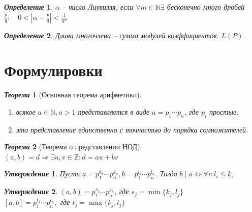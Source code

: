 \documentclass[a4paper,12pt]{article}
\newtheorem{deff2}{\textit{Определение}}
\newtheorem{teo2}{\textit{Теорема}}
\newtheorem{utv2}{\textit{Утверждение}}
\newcommand{\AL}{\alpha}
\newcommand{\q}{\quad}
\newcommand{\Ra}{\Rightarrow}
\newcommand{\bb}[1]{\mathbb{#1}}
\begin{document}
\begin{formbox}{}
\begin{deff2} $\AL$ -- число Лиувилля, если $\forall m\in\bb{N} \exists$ бесконечно много дробей $\frac{p}{q}: \q 0 < |\AL - \frac{p}{q}| < \frac{1}{q^m}$
\end{deff2}
\end{formbox}
\begin{formbox}{}
\begin{deff2} Длина многочлена -- сумма модулей коэффициентов. $L(P)$
\end{deff2}
\end{formbox}









\newpage
\section{Формулировки}
\begin{formbox}{}
\begin{teo2}[Основная теорема арифметики]\q\\
\begin{enumerate}
    \item всякое $a \in \bb{N}, a > 1$ представляется в виде $a = p_1\cdots p_n$, где $p_i$ простые.
    \item это представление единственно с точностью до порядка сомножителей.
\end{enumerate}
\end{teo2}
\end{formbox}
\begin{formbox}{}
\begin{teo2}[Теорема о представлении НОД]\q\\
$(a,b) = d \Ra \exists u,v\in\bb{Z}: d = au+bv$
\end{teo2}
\end{formbox}
\begin{formbox}{}
\begin{utv2} Пусть $a = p_1^{k_1}\cdots p_n^{k_n}, b = p_1^{l_1}\cdots p_n^{l_n}$. Тогда $b\mid a\iff \forall i: l_i \le k_i$
\end{utv2}
\end{formbox}

\begin{formbox}{}
\begin{utv2} $(a,b) = p_1^{s_1}\cdots p_n^{s_n}$, где $s_j = \min\{k_j, l_j\}$\\
$[a,b] = p_1^{t_1}\cdots p_n^{t_n},$ где $t_j = \max\{k_j, l_j\}$
\end{utv2}
\end{formbox}
\end{document}
